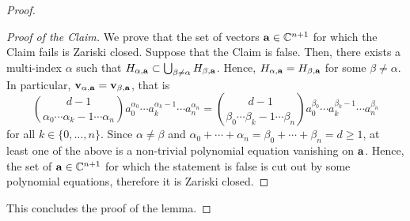 \documentclass[10pt,a4paper]{amsart}
\newcommand{\bbC}{\mathbb{C}}
\begin{document}
\begin{proof}
\begin{proof}[Proof of the Claim]
        We prove that the set of vectors ${\bf a} \in \bbC^{n+1}$ for which the Claim fails is Zariski closed. Suppose that the Claim is false. Then, there exists a multi-index $\alpha$ such that $H_{\alpha,{\bf a}} \subset \bigcup_{\beta \neq \alpha} H_{\beta, {\bf a}}$. Hence, $H_{\alpha,{\bf a}} = H_{\beta,{\bf a}}$ for some $\beta \neq \alpha$. In particular, ${\bf v}_{\alpha,{\bf a}} = {\bf v}_{\beta,{\bf a}}$, that is
        \[
            \binom{d-1}{\alpha_0 \cdots \alpha_{k} -1 \cdots \alpha_n}a_0^{\alpha_0} \cdots a_k^{\alpha_k -1} \cdots a_n^{\alpha_n} = \binom{d-1}{\beta_0 \cdots \beta_{k} -1 \cdots \beta_n}a_0^{\beta_0} \cdots a_k^{\beta_k -1} \cdots a_n^{\beta_n}
        \]
        for all $k \in \{0,\ldots,n\}$. Since $\alpha \neq \beta$ and $\alpha_0 + \cdots + \alpha_n = \beta_0 + \cdots + \beta_n = d \geq 1$, at least one of the above is a non-trivial polynomial equation vanishing on ${\bf a}$. Hence, the set of ${\bf a} \in \bbC^{n+1}$ for which the statement is false is cut out by some polynomial equations, therefore it is Zariski closed.
    \end{proof}
    This concludes the proof of the lemma.
\end{proof}
\end{document}
